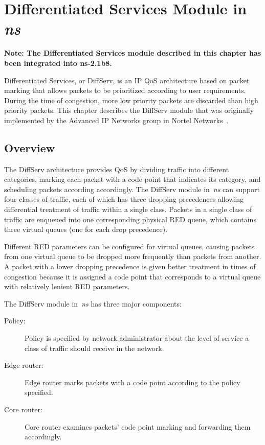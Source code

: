 \chapter{Differentiated Services Module in \emph{ns}}
\label{chap:diffserv}

\textbf{Note: The Differentiated Services module described in this chapter has been integrated into ns-2.1b8.}

Differentiated Services, or DiffServ, is an IP QoS architecture based on 
  packet marking that allows packets to be prioritized according to user 
  requirements.  
During the time of congestion, 
  more low priority packets are discarded than high priority packets.
This chapter describes the DiffServ module that was originally 
  implemented by the Advanced IP Networks group in 
  Nortel Networks~\cite{Diffserv}.

\section{Overview}
\label{sec:diffservoverview}

The DiffServ architecture provides QoS by 
  dividing traffic into different categories, 
  marking each packet with a code point that indicates its category, 
  and scheduling packets according accordingly. 
The DiffServ module in~\emph{ns} can support four classes of traffic, 
  each of which has three dropping precedences allowing
  differential treatment of traffic within a single class. 
Packets in a single class of traffic are enqueued into 
  one corresponding physical RED queue, 
  which contains three virtual queues (one for each drop precedence).

Different RED parameters can be configured for virtual queues, 
  causing packets from one virtual queue to be dropped 
  more frequently than packets from another.  
A packet with a lower dropping precedence is given 
  better treatment in times of congestion 
  because it is assigned a code point that corresponds to a virtual 
  queue with relatively lenient RED parameters.  

The DiffServ module in~\emph{ns} has three major components:

\begin{description}
\item [Policy:]
Policy is specified by network administrator about 
  the level of service a class of traffic should receive in the network.  

\item [Edge router:]
Edge router marks packets with a code point according to the policy specified.

\item [Core router:]
Core router examines packets' code point marking and forwarding them accordingly.

\end{description}

